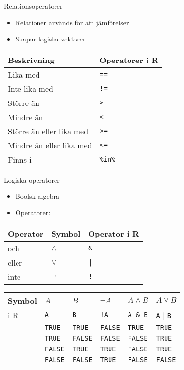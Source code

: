 \documentclass[
  10pt,
  ignorenonframetext,
]{beamer}
\providecommand{\tightlist}{%
  \setlength{\itemsep}{0pt}\setlength{\parskip}{0pt}}
\begin{document}
\begin{frame}{Relationsoperatorer}
\protect\hypertarget{relationsoperatorer}{}
\begin{itemize}
\tightlist
\item
  Relationer används för att jämförelser
\item
  Skapar logiska vektorer
\end{itemize}

\begin{longtable}[]{@{}ll@{}}
\toprule
Beskrivning & Operatorer i R \\
\midrule
\endhead
Lika med & \texttt{==} \\
Inte lika med & \texttt{!=} \\
Större än & \texttt{>} \\
Mindre än & \texttt{<} \\
Större än eller lika med & \texttt{>=} \\
Mindre än eller lika med & \texttt{<=} \\
Finns i & \texttt{\%in\%} \\
\bottomrule
\end{longtable}
\end{frame}

\begin{frame}[fragile]{Logiska operatorer}
\protect\hypertarget{logiska-operatorer}{}
\begin{itemize}
\tightlist
\item
  Boolsk algebra
\item
  Operatorer:
\end{itemize}

\begin{longtable}[]{@{}lll@{}}
\toprule
Operator & Symbol & Operator i R \\
\midrule
\endhead
och & \(\wedge{}\) & \texttt{\&} \\
eller & \(\vee{}\) & \texttt{|} \\
inte & \(\neg{}\) & \texttt{!} \\
\bottomrule
\end{longtable}

\pause

\begin{longtable}[]{@{}llllll@{}}
\toprule
Symbol & \(A\) & \(B\) & \(\neg A\) & \(A \wedge B\) & \(A \vee B\) \\
\midrule
\endhead
i R & \texttt{A} & \texttt{B} & \texttt{!A} & \texttt{A\ \&\ B} &
\texttt{A} \(|\) \texttt{B} \\
& \texttt{TRUE} & \texttt{TRUE} & \texttt{FALSE} & \texttt{TRUE} &
\texttt{TRUE} \\
& \texttt{TRUE} & \texttt{FALSE} & \texttt{FALSE} & \texttt{FALSE} &
\texttt{TRUE} \\
& \texttt{FALSE} & \texttt{TRUE} & \texttt{TRUE} & \texttt{FALSE} &
\texttt{TRUE} \\
& \texttt{FALSE} & \texttt{FALSE} & \texttt{TRUE} & \texttt{FALSE} &
\texttt{FALSE} \\
\bottomrule
\end{longtable}
\end{frame}
\end{document}
